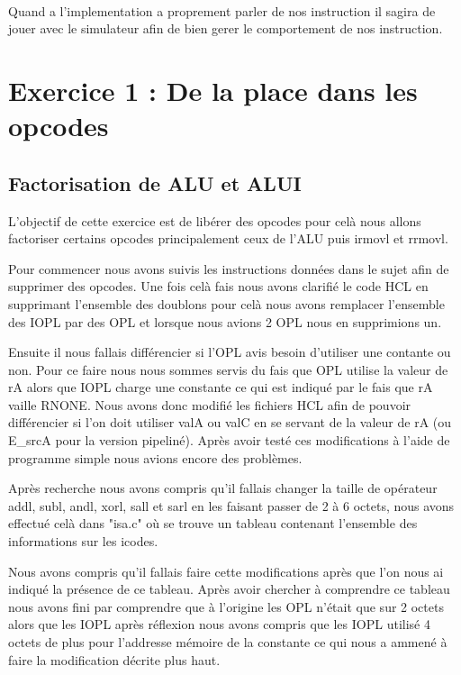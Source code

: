 \documentclass[12pt]{article}
\begin{document}
\paragraph{} Quand a l'implementation a proprement parler de nos instruction il
sagira de jouer avec le simulateur afin de bien gerer le comportement de nos instruction.

\newpage


\section{Exercice 1 : De la place dans les opcodes}
\subsection{Factorisation de ALU et ALUI}
L'objectif de cette exercice est de libérer des opcodes pour celà nous allons factoriser certains opcodes principalement ceux de l'ALU puis irmovl et rrmovl.

Pour commencer nous avons suivis les instructions données dans le sujet afin de supprimer des opcodes. Une fois celà fais nous avons clarifié le code HCL en supprimant l'ensemble des doublons pour celà nous avons remplacer l'ensemble des IOPL par des OPL et lorsque nous avions 2 OPL nous en supprimions un.

Ensuite il nous fallais différencier si l'OPL avis besoin d'utiliser une contante ou non. Pour ce faire nous nous sommes servis du fais que OPL utilise la valeur de rA alors que IOPL charge une constante ce qui est indiqué par le fais que rA vaille RNONE. Nous avons donc  modifié les fichiers HCL afin de pouvoir différencier si l'on doit utiliser valA ou valC en se servant de la valeur de rA (ou E\_srcA pour la version pipeliné). Après avoir testé ces modifications à l'aide de programme simple nous avions encore des problèmes.

 Après recherche nous avons compris qu'il fallais changer la taille de opérateur addl, subl, andl, xorl, sall et sarl en les faisant passer de 2 à 6 octets, nous avons effectué celà dans "isa.c" où se trouve un tableau contenant l'ensemble des informations sur les icodes. 

 Nous avons compris qu'il fallais faire cette modifications après que l'on nous ai indiqué la présence de ce tableau. Après avoir chercher à comprendre ce tableau nous avons fini par comprendre que à l'origine les OPL n'était que sur 2 octets alors que les IOPL après réflexion nous avons compris que les IOPL utilisé 4 octets de plus pour l'addresse mémoire de la constante ce qui nous a ammené à faire la modification décrite plus haut. 
\end{document}
